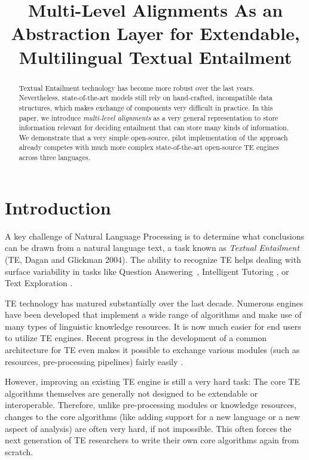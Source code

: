 \documentclass[11pt,letterpaper]{article}
\title{Multi-Level Alignments As an Abstraction Layer for Extendable,
  Multilingual Textual Entailment}
\date{}
\begin{document}
\maketitle
\begin{abstract}
  Textual Entailment technology has become more robust over the last
  years. Nevertheless, state-of-the-art models still rely on
  hand-crafted, incompatible data structures, which makes exchange of
  components very difficult in practice. In this paper, we introduce
  {\em multi-level alignments} as a very general representation to
  store information relevant for deciding entailment that can store
  many kinds of information. 
  We demonstrate that a very simple open-source, pilot implementation
  of the approach already competes with much more complex
  state-of-the-art open-source TE engines across three languages. 
\end{abstract}

\section{Introduction}
A key challenge of Natural Language Processing is to determine what
conclusions can be drawn from a natural language text, a task known as
\textit{Textual Entailment} (TE, Dagan and Glickman
2004).\nocite{dagan04:_probab_textual_entail} The ability to recognize
TE helps dealing with surface variability in tasks like Question
Answering~\cite{harabagiu-hickl:2006:COLACL}, Intelligent Tutoring
\cite{nielsen09:_recog_entail_in_intel_tutor_system}, or Text
Exploration \cite{berant2012learning}.

TE technology has matured substantially over the last decade. Numerous
engines have been developed that implement a wide range of algorithms
and make use of many types of linguistic knowledge resources. It is
now much easier for end users to utilize TE engines. Recent progress
in the development of a common architecture for TE even makes it
possible to exchange various modules (such as resources,
pre-processing pipelines) fairly easily \cite{EOP-arch}.

However, improving an existing TE engine is still a very hard task:
The core TE algorithms themselves are generally not designed to be
extendable or interoperable. Therefore, unlike pre-processing modules 
or knowledge resources, changes to the core algorithms (like adding
support for a new language or a new aspect of analysis) are often very
hard, if not impossible. This often forces the next generation of TE
researchers to write their own core algorithms again from scratch. 
\end{document}
